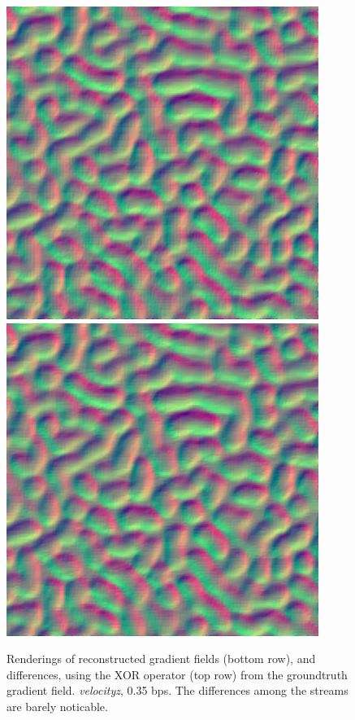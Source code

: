 \begin{figure}[h]
	{\includegraphics[width=0.24\linewidth]{img/gradient/gradient_2.png}}
	{\includegraphics[width=0.24\linewidth]{img/gradient/gradient_3.png}}
	\caption{Renderings of reconstructed gradient fields (bottom row), and differences, using the XOR
	operator (top row) from the groundtruth gradient field. \emph{velocityz}, 0.35 bps. The
	differences among the streams are barely noticable.}
  \label{fig:gradient-rendering}
\end{figure}

